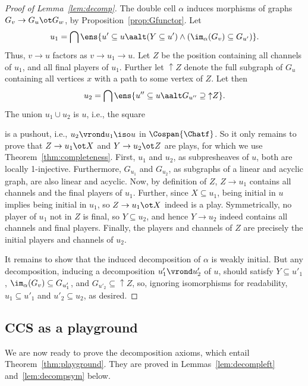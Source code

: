 \documentclass{LMCS}
\theoremstyle{plain}\newtheorem{satz}[thm]{Satz}
\begin{document}
\begin{proof}[Proof of Lemma~\ref{lem:decomp}]
  The double cell $\alpha$ induces morphisms of graphs $G_v \to G_u
  \ot G_w$, by Proposition~\ref{prop:Gfunctor}.  Let $$u_1 = \bigcap
  \ens{u' \subseteq u \aalt (Y \subseteq u') \wedge (\im_\alpha (G_v)
    \subseteq G_{u'})}.$$ Thus, $v \to u$ factors as $v \to u_1 \to
  u$.  Let $Z$ be the position containing all channels of $u_1$, and
  all final players of $u_1$.  Further let ${\uparrow} Z$ denote the
  full subgraph of $G_u$ containing all vertices $x$ with a path to
  some vertex of $Z$. Let then
$$u_2 = \bigcap \ens{u'' \subseteq u \aalt G_{u''} \supseteq {{\uparrow} Z}}.$$
 The union $u_1 \cup u_2$
  is $u$, i.e., the square
  \begin{center}
  \end{center}
  is a pushout, i.e., $u_2 \vrond u_1 \iso u$ in $\Cospan{\Chatf}$. So
  it only remains to prove that $Z \to u_1 \ot X$ and $Y \to u_2 \ot
  Z$ are plays, for which we use
  Theorem~\ref{thm:completeness}. First, $u_1$ and $u_2$, as
  subpresheaves of $u$, both are locally 1-injective. Furthermore,
  $G_{u_1}$ and $G_{u_2}$, as subgraphs of a linear and acyclic graph,
  are also linear and acyclic. Now, by definition of $Z$, $Z \to u_1$
  contains all channels and the final players of $u_1$. Further, since
  $X \subseteq u_1$, being initial in $u$ implies being initial in
  $u_1$, so $Z \to u_1 \ot X$ indeed is a play. Symmetrically, no
  player of $u_1$ not in $Z$ is final, so $Y \subseteq u_2$, and hence
  $Y \to u_2$ indeed contains all channels and final players.
  Finally, the players and channels of $Z$ are precisely the initial
  players and channels of $u_2$.  

  It remains to show that the induced decomposition of $\alpha$ is
  weakly initial.  But any decomposition, inducing a decomposition
  $u'_1 \vrond u'_2$ of $u$, should satisfy $Y \subseteq u'_1$,
  $\im_\alpha (G_v) \subseteq G_{u'_1}$, and $G_{u'_2} \subseteq
  {{\uparrow} Z}$, so, ignoring isomorphisms for readability, $u_1
  \subseteq u'_1$ and $u'_2 \subseteq u_2$, as desired.
\end{proof}

\subsection{CCS as a playground}
We are now ready to prove the decomposition axioms, which entail
Theorem~\ref{thm:playground}. They are proved in
Lemmas~\ref{lem:decompleft} and~\ref{lem:decompsym} below.
\end{document}
